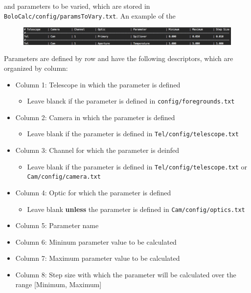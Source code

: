 \documentclass[11pt]{article} %
\begin{document}
 and parameters to be varied, which are stored in \texttt{BoloCalc/config/paramsToVary.txt}. An example of the 

\begin{figure}[h!]
	\centering
	\includegraphics[width=1.0\textwidth]{ParamsToVary_Example}
\end{figure}

Parameters are defined by row and have the following descriptors, which are organized by column:

\begin{itemize}[noitemsep,topsep=0pt]
	\item Column 1: Telescope in which the parameter is defined
		\begin{itemize}[noitemsep,topsep=0pt]
		\item Leave blanck if the parameter is defined in \texttt{config/foregrounds.txt}
		\end{itemize}
	\item Column 2: Camera in which the parameter is defined 
		\begin{itemize}[noitemsep,topsep=0pt]
		\item Leave blank if the parameter is defined in \texttt{Tel/config/telescope.txt}
		\end{itemize}
	\item Column 3: Channel for which the parameter is deinfed 
		\begin{itemize}[noitemsep,topsep=0pt]
		\item Leave blank if the parameter is defined in \texttt{Tel/config/telescope.txt} or \texttt{Cam/config/camera.txt}
		\end{itemize}
	\item Column 4: Optic for which the parameter is defined
		\begin{itemize}[noitemsep,topsep=0pt]
		\item Leave blank \textbf{unless} the parameter is defined in \texttt{Cam/config/optics.txt}
		\end{itemize}
	\item Column 5: Parameter name
	\item Column 6: Mininum parameter value to be calculated
	\item Column 7: Maximum parameter value to be calculated
	\item Column 8: Step size with which the parameter will be calculated over the range [Minimum, Maximum]
\end{itemize}
\end{document}
